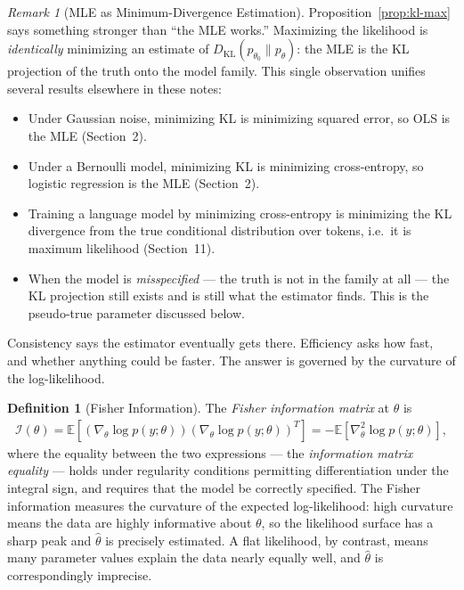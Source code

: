 \documentclass[11pt]{article}
\theoremstyle{definition}
\newtheorem{definition}{Definition}[section]
\theoremstyle{plain}
\theoremstyle{remark}
\newtheorem{remark}{Remark}[section]
\begin{document}
\begin{remark}[MLE as Minimum-Divergence Estimation]
    Proposition~\ref{prop:kl-max} says something stronger than ``the MLE works.'' Maximizing the likelihood is \emph{identically} minimizing an estimate of $D_{\mathrm{KL}}(p_{\theta_0}\|p_\theta)$: the MLE is the KL projection of the truth onto the model family. This single observation unifies several results elsewhere in these notes:
    \begin{itemize}[noitemsep]
        \item Under Gaussian noise, minimizing KL is minimizing squared error, so OLS is the MLE (Section~2).
        \item Under a Bernoulli model, minimizing KL is minimizing cross-entropy, so logistic regression is the MLE (Section~2).
        \item Training a language model by minimizing cross-entropy is minimizing the KL divergence from the true conditional distribution over tokens, i.e.\ it is maximum likelihood (Section~11).
        \item When the model is \emph{misspecified} --- the truth is not in the family at all --- the KL projection still exists and is still what the estimator finds. This is the pseudo-true parameter discussed below.
    \end{itemize}
\end{remark}

Consistency says the estimator eventually gets there. Efficiency asks how fast, and whether anything could be faster. The answer is governed by the curvature of the log-likelihood.

\begin{definition}[Fisher Information]
    The \emph{Fisher information matrix} at $\theta$ is
    \begin{align}
        \mathcal{I}(\theta) = \mathbb{E}\!\left[\left(\nabla_\theta \log p(y;\theta)\right)\left(\nabla_\theta \log p(y;\theta)\right)^T\right] = -\mathbb{E}\!\left[\nabla^2_\theta \log p(y;\theta)\right],
    \end{align}
    where the equality between the two expressions --- the \emph{information matrix equality} --- holds under regularity conditions permitting differentiation under the integral sign, and requires that the model be correctly specified. The Fisher information measures the curvature of the expected log-likelihood: high curvature means the data are highly informative about $\theta$, so the likelihood surface has a sharp peak and $\hat{\theta}$ is precisely estimated. A flat likelihood, by contrast, means many parameter values explain the data nearly equally well, and $\hat{\theta}$ is correspondingly imprecise.
\end{definition}
\end{document}
